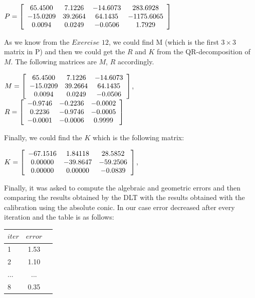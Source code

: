 \documentclass[]{article}
\begin{document}
\centerline {
	$ P =\left[ {\begin{array}{*{20}c}
		65.4500 & 7.1226 & -14.6073 & 283.6928 \\
		-15.0209 & 39.2664 & 64.1435 & -1175.6065 \\
		0.0094 & 0.0249 & -0.0506 & 1.7929   
		\end{array} } \right] $
}

\vspace{0.5em}

As we know from the $Exercise$ $12$, we could find M (which is the first $3 \times 3$ matrix in P) and then we could get the $R$ and $K$ from the QR-decomposition of $M$. The following matrices are $M$, $R$ accordingly. 

\vspace{0.5em}

 \centerline {
 	$ M =\left[ {\begin{array}{*{20}c}
 		65.4500 & 7.1226 & -14.6073  \\
 		-15.0209 & 39.2664 & 64.1435  \\
 		 0.0094 & 0.0249 & -0.0506    
 		\end{array} } \right] $, $ R =\left[ {\begin{array}{*{20}c}
 		-0.9746 & -0.2236 & -0.0002  \\
 		0.2236 & -0.9746 & -0.0005  \\
 		-0.0001 & -0.0006 & 0.9999    
 		\end{array} } \right] $
 }

\vspace{0.5em}

Finally, we could find the $K$ which is the following matrix: 

\vspace{0.5em}

\centerline {
	$ K =\left[ {\begin{array}{*{20}c}
		-67.1516 & 1.84118 & 28.5852  \\
		0.00000 & -39.8647 & -59.2506  \\
		0.00000 & 0.00000 & -0.0839    
		\end{array} } \right] $,
}

\vspace{0.5em}

Finally, it was asked to compute the algebraic and geometric errors and then comparing the results obtained by the DLT with the results obtained with the calibration using the absolute conic. In our case error decreased after every iteration and the table is as follows:

\begin{table}[h!]
	\begin{center}
		\label{tab:table1}
		\begin{tabular}{l|c|r} 
			$iter$ & $error$ \\
			\hline
			1 & 1.53 \\
			2 & 1.10 \\
			... & ... \\
			8 & 0.35 \\
		\end{tabular}
	\end{center}
\end{table}
\end{document}
